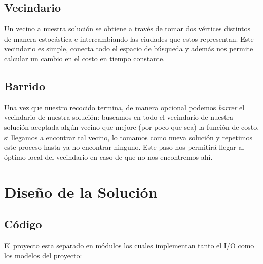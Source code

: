 \documentclass[11pt,letterpaper]{article}
\begin{document}
\subsection{Vecindario}
Un vecino a nuestra solución se obtiene a través de tomar dos vértices distintos de manera estocástica e intercambiando las ciudades que estos representan. Este vecindario es simple, conecta todo el espacio de búsqueda y además nos permite calcular un cambio en el costo en tiempo constante.

\subsection{Barrido}
Una vez que nuestro recocido termina, de manera opcional podemos \emph{barrer} el vecindario de nuestra solución: buscamos en todo el vecindario de nuestra solución aceptada algún vecino que mejore (por poco que sea) la función de costo, si llegamos a encontrar tal vecino, lo tomamos como nueva solución y repetimos este proceso hasta ya no encontrar ninguno. Este paso nos permitirá llegar al óptimo local del vecindario en caso de que no nos encontremos ahí.

\section{Diseño de la Solución}
\subsection{Código}

El proyecto esta separado en módulos los cuales implementan tanto el I/O como los modelos del proyecto:
\end{document}
